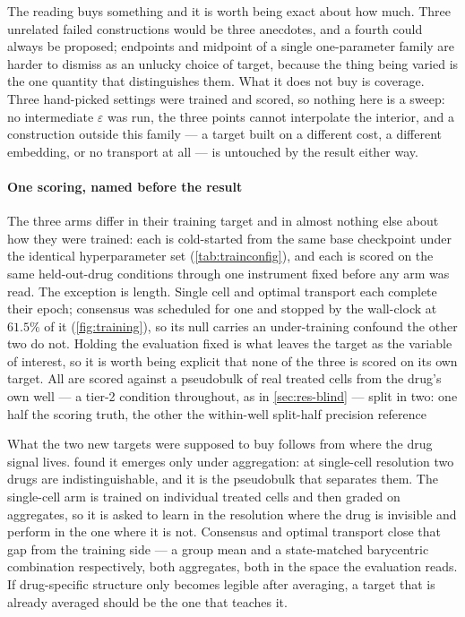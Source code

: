 The reading buys something and it is worth being exact about how much. Three
unrelated failed constructions would be three anecdotes, and a fourth could always
be proposed; endpoints and midpoint of a single one-parameter family are harder to
dismiss as an unlucky choice of target, because the thing being varied is the one
quantity that distinguishes them. What it does not buy is coverage. Three
hand-picked settings were trained and scored, so nothing here is a sweep: no
intermediate $\varepsilon$ was run, the three points cannot interpolate the
interior, and a construction outside this family --- a target built on a different
cost, a different embedding, or no transport at all --- is untouched by the result
either way.

\paragraph{One scoring, named before the result} The three arms differ in their
training target and in almost nothing else about how they were trained: each is
cold-started from the same base checkpoint under the identical hyperparameter set
(\cref{tab:trainconfig}), and each is scored on the same held-out-drug conditions
through one instrument fixed before any arm was read. The exception is length.
Single cell and optimal transport each complete their epoch; consensus was
scheduled for one and stopped by the wall-clock at $61.5\%$ of it
(\cref{fig:training}), so its null carries an under-training confound the other
two do not. Holding the evaluation
fixed is what leaves the target as the variable of interest, so it is worth being
explicit that none of the three is scored on its own target. All are scored against a pseudobulk of real treated cells from the drug's own well — a tier-2 condition throughout, as in \cref{sec:res-blind} — split in two: one half the scoring truth, the other the within-well split-half precision reference

What the two new targets were supposed to buy follows from where the drug signal
lives.  found it emerges only under aggregation: at
single-cell resolution two drugs are indistinguishable, and it is the pseudobulk
that separates them. The single-cell arm is trained on individual treated cells
and then graded on aggregates, so it is asked to learn in the resolution where
the drug is invisible and perform in the one where it is not. Consensus and
optimal transport close that gap from the training side --- a group mean and a
state-matched barycentric combination respectively, both aggregates, both in the
space the evaluation reads. If drug-specific structure only becomes legible after
averaging, a target that is already averaged should be the one that teaches it.


